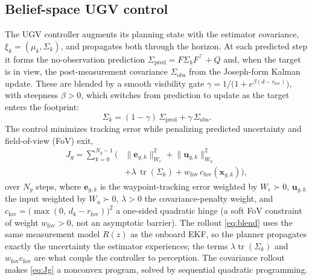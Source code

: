 \documentclass{ifacconf}
\begin{document}
\subsection{Belief-space UGV control}
\label{sec:ugv}
The UGV controller augments its planning state with the estimator covariance,
$\xi_k=(\mu_k,\Sigma_k)$, and propagates both through the horizon. At each predicted step it forms the
no-observation prediction $\Sigma_{\mathrm{pred}}=F\Sigma_kF^{\!\top}+Q$ and, when the target is in
view, the post-measurement covariance $\Sigma_{\mathrm{obs}}$ from the Joseph-form Kalman update.
These are blended by a smooth visibility gate $\gamma=1/\big(1+e^{\beta(d-r_{\mathrm{fov}})}\big)$,
with steepness $\beta>0$, which switches from prediction to update as the target enters the footprint:
\begin{equation}
\Sigma_k=(1-\gamma)\,\Sigma_{\mathrm{pred}}+\gamma\,\Sigma_{\mathrm{obs}}.
\label{eq:blend}
\end{equation}
The control minimizes tracking error while penalizing predicted uncertainty and field-of-view (FoV)
exit,
\begin{equation}
\begin{split}
J_g=\sum_{k=0}^{N_g-1}\Big(&\lVert\mathbf{e}_{g,k}\rVert_{W_e}^2+\lVert\mathbf{u}_{g,k}\rVert_{W_u}^2\\
&+\lambda\,\operatorname{tr}(\Sigma_k)+w_{\mathrm{fov}}\,c_{\mathrm{fov}}(\mathbf{x}_{g,k})\Big),
\end{split}
\label{eq:Jg}
\end{equation}
over $N_g$ steps, where $\mathbf{e}_{g,k}$ is the waypoint-tracking error weighted by $W_e\succ0$,
$\mathbf{u}_{g,k}$ the input weighted by $W_u\succ0$, $\lambda>0$ the covariance-penalty weight, and
$c_{\mathrm{fov}}=\big(\max(0,\,d_k-r_{\mathrm{fov}})\big)^2$ a one-sided quadratic hinge (a soft FoV
constraint of weight $w_{\mathrm{fov}}>0$, not an asymptotic barrier). The rollout \eqref{eq:blend}
uses the same measurement model $R(z)$ as the onboard EKF, so the planner propagates exactly the
uncertainty the estimator experiences; the terms $\lambda\operatorname{tr}(\Sigma_k)$ and
$w_{\mathrm{fov}}c_{\mathrm{fov}}$ are what couple the controller to perception. The covariance rollout
makes \eqref{eq:Jg} a nonconvex program, solved by sequential quadratic programming.
\end{document}
